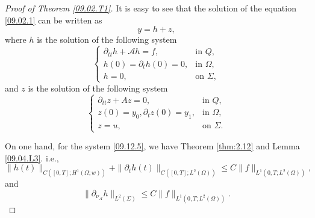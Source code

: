 \documentclass[10pt,a4paper]{amsart}
\def\Om{\Omega}
\def\mcA{\mathcal{A}}
\def\pt{\partial}
\begin{document}
\begin{proof}[Proof of Theorem \ref{09.02.T1}]
	It is easy to see that the solution of the equation \eqref{09.02.1} can be written as 
	\begin{equation*}
		y=h+z, 
	\end{equation*}
	where $h$ is the solution of the following system
	\begin{equation}\label{09.12.5}
		\begin{cases}
			\pt_{tt}h+\mcA h=f, &\mbox{in }Q, \\
			h(0)=\pt_th(0)=0, &\mbox{in }\Om,\\
			h=0, &\mbox{on }\Sigma, 
		\end{cases}
	\end{equation}
	and $z$ is the solution of the following system
	\begin{equation}\label{09.12.6}
		\begin{cases}
			\pt_{tt}z+A z=0, &\mbox{in }Q, \\
			z(0)=y_0, \pt_tz(0)=y_1, &\mbox{in }\Om,\\
			z=u, &\mbox{on }\Sigma. 
		\end{cases}
	\end{equation}
	
	On one hand, for the system \eqref{09.12.5}, we have Theorem \ref{thm:2.12} and Lemma \ref{09.04.L3}. i.e., 
	\begin{equation*}
		\|h(t)\|_{C([0,T];H^1(\Om;w))}+\|\pt_t h(t)\|_{C([0,T]; L^2(\Om))}\leq C\|f\|_{L^1(0,T; L^2(\Om))}, 
	\end{equation*}
	and 
	\begin{equation*} 
		\|\pt_{\nu_\mcA} h\|_{L^2(\Sigma)}\leq C \|f\|_{L^1(0,T; L^2(\Om))}.
	\end{equation*}
	

\end{proof}
\end{document}
